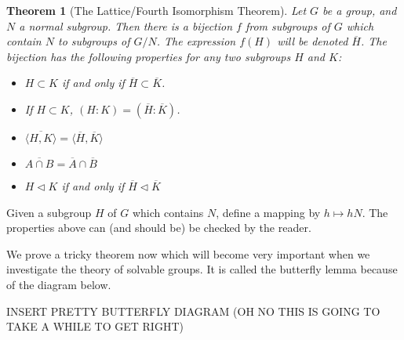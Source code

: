 \documentclass[12pt]{amsbook}
\makeatletter
\theoremstyle{plain}
\newtheorem{theorem}{Theorem}[chapter]
\theoremstyle{definition}
\renewenvironment{proof}[1][\proofname]{\par
  \pushQED{\qed}%
  \normalfont \topsep6\p@\@plus6\p@\relax
  \list{}{\leftmargin=0em
          \rightmargin=\leftmargin
          \settowidth{\itemindent}{\itshape#1}%
          \labelwidth=\itemindent}

  \item[\hskip\labelsep
        \itshape
    #1\@addpunct{.}]\ignorespaces
}{%
  \popQED\endlist\@endpefalse
}
\makeatother
\begin{document}
\begin{theorem}[The Lattice/Fourth Isomorphism Theorem]  
Let $G$ be a group, and $N$ a normal subgroup. Then there is a bijection $f$ from subgroups of $G$ which contain $N$ to subgroups of $G/N$. The expression $f(H)$ will be denoted $\overline{H}$. The bijection has the following properties for any two subgroups $H$ and $K$:

\begin{itemize}
    \item $H \subset K$ if and only if $\overline{H} \subset \overline{K}$.
    \item If $H \subset K$, $(H:K) = (\overline{H}:\overline{K})$.
    \item $\overline{\langle H, K \rangle} = \langle \overline{H}, \overline{K} \rangle$
    \item $\overline{A \cap B} = \overline{A} \cap \overline{B}$
    \item $H \lhd K$ if and only if $\overline{H} \lhd \overline{K}$
\end{itemize}
\end{theorem}
\begin{proof}
    Given a subgroup $H$ of $G$ which contains $N$, define a mapping by $h \mapsto hN$. The properties above can (and should be) be checked by the reader.
\end{proof}

We prove a tricky theorem now which will become very important when we investigate the theory of solvable groups. It is called the butterfly lemma because of the diagram below.

INSERT PRETTY BUTTERFLY DIAGRAM (OH NO THIS IS GOING TO TAKE A WHILE TO GET RIGHT)
\end{document}
